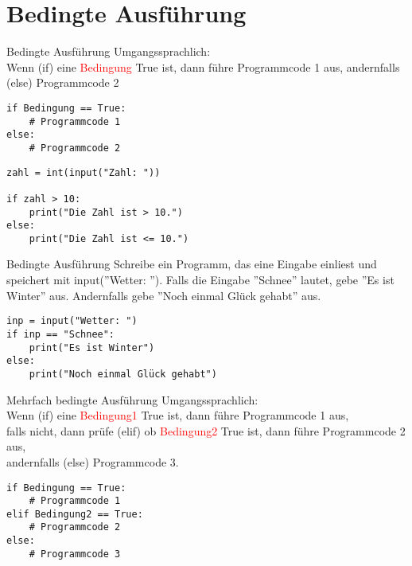 \section{Bedingte Ausführung}

\begin{frame}[fragile]{Bedingte Ausführung}
Umgangssprachlich:\\ Wenn (if) eine \textcolor{red}{Bedingung} True ist, dann führe Programmcode 1 aus, andernfalls (else) Programmcode 2\\

\begin{lstlisting}
if Bedingung == True:
	# Programmcode 1 
else:
	# Programmcode 2 
\end{lstlisting}

\begin{lstlisting}
zahl = int(input("Zahl: "))

if zahl > 10:
	print("Die Zahl ist > 10.")
else:
	print("Die Zahl ist <= 10.")
\end{lstlisting}
\end{frame}

\begin{frame}[fragile]{Bedingte Ausführung}
Schreibe ein Programm, das eine Eingabe einliest und speichert mit input(''Wetter: '').
Falls die Eingabe ''Schnee'' lautet, gebe ''Es ist Winter'' aus. Andernfalls gebe ''Noch einmal Glück gehabt'' aus.
\pause{}
\begin{lstlisting}
inp = input("Wetter: ")
if inp == "Schnee":
    print("Es ist Winter")
else:
    print("Noch einmal Glück gehabt")
\end{lstlisting}
\end{frame}

\begin{frame}[fragile]{Mehrfach bedingte Ausführung}
Umgangssprachlich:\\ Wenn (if) eine \textcolor{red}{Bedingung1} True ist, dann führe Programmcode 1 aus, \\falls nicht, dann prüfe (elif) ob \textcolor{red}{Bedingung2} True ist, dann führe Programmcode 2 aus, \\andernfalls (else) Programmcode 3.\\

\begin{lstlisting}
if Bedingung == True:
    # Programmcode 1
elif Bedingung2 == True:
    # Programmcode 2
else:
    # Programmcode 3
\end{lstlisting}
\end{frame}


